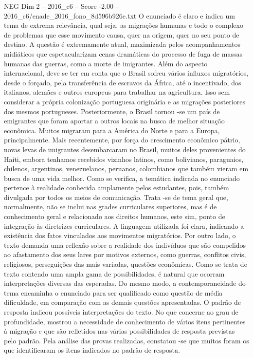 \begin{textsample}{NEG Dim 2 – 2016\_c6 – Score -2.00 – 2016\_c6/enade\_2016\_fono\_8d596b926e.txt}
O enunciado é claro e indica um tema de extrema relevância, qual seja, as migrações humanas e todo o complexo de problemas que esse movimento causa, quer na origem, quer no seu ponto de destino.
A questão é extremamente atual, maximizada pelos acompanhamentos midiáticos que espetacularizam cenas dramáticas do processo de fuga de massas humanas das guerras, como a morte de imigrantes.
Além do aspecto internacional, deve se ter em conta que o Brasil sofreu vários influxos migratórios, desde o forçado, pela transferência de escravos da África, até o incentivado, dos italianos, alemães e outros europeus para trabalhar na agricultura.
Isso sem considerar a própria colonização portuguesa originária e as migrações posteriores dos mesmos portugueses.
Posteriormente, o Brasil tornou -se um país de emigrantes que foram aportar a outros locais na busca de melhor situação econômica.
Muitos migraram para a América do Norte e para a Europa, principalmente.
Mais recentemente, por força do crescimento econômico pátrio, novas levas de imigrantes desembarcaram no Brasil, muitos deles provenientes do Haiti, embora tenhamos recebidos vizinhos latinos, como bolivianos, paraguaios, chilenos, argentinos, venezuelanos, peruanos, colombianos que também vieram em busca de uma vida melhor.
Como se verifica, a temática indicada no enunciado pertence à realidade conhecida amplamente pelos estudantes, pois, também divulgada por todos os meios de comunicação.
Trata -se de tema geral que, normalmente, não se inclui nas grades curriculares superiores, mas é de conhecimento geral e relacionado aos direitos humanos, este sim, ponto de integração às diretrizes curriculares.
A linguagem utilizada foi clara, indicando a existência dos fatos vinculados aos movimentos migratórios.
Por outro lado, o texto demanda uma reflexão sobre a realidade dos indivíduos que são compelidos ao afastamento dos seus lares por motivos externos, como guerras, conflitos civis, religiosos, perseguições das mais variadas, questões econômicas.
Como se trata de texto contendo uma ampla gama de possibilidades, é natural que ocorram interpretações diversas das esperadas.
Do mesmo modo, a contemporaneidade do tema encaminha o enunciado para ser qualificado como questão de média dificuldade, em comparação com as demais questões apresentadas.
O padrão de resposta indicou possíveis interpretações do texto.
No que concerne ao grau de profundidade, mostrou a necessidade de conhecimento de vários itens pertinentes à migração e que são refletidos nas várias possibilidades de resposta previstas pelo padrão.
Pela análise das provas realizadas, constatou -se que muitos foram os que identificaram os itens indicados no padrão de resposta.

\end{textsample}
